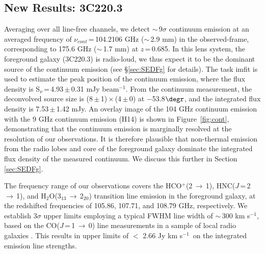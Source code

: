 \documentclass[twocolumn,apj,numberedappendix]{emulateapj}
\newcommand{\rarr}{$\rightarrow$}
\newcommand{\pmOne}{\mbox{$^{-1}$}}
\begin{document}
\subsection{New Results: 3C220.3} 
Averaging over all line-free channels, we detect $\sim$\,9$\sigma$ continuum emission at an averaged frequency of $\nu_{cont}$\,=\,104.2106 GHz ($\sim$\,2.9 mm) in the observed-frame, corresponding to 175.6 GHz ($\sim$\,1.7 mm) at $z$\,=\,0.685. In this lens system, the 
foreground galaxy (3C220.3) is radio-loud, we thus expect it to be the dominant source of the continuum emission (see \S \ref{sec:SEDFg} for details). The task {\sc imfit} is used to estimate the peak position of the continuum emission, where the flux density is S$_\nu$\,=\,4.93\,$\pm$\,0.31\,\,mJy\,\,beam\pmOne. From the continuum measurement, the deconvolved source size 
is (8\,$\pm$\,1)\,$\times$\,(4\,$\pm$\,0) at $-$53.8$\degr$, and the integrated flux density is 7.53\,$\pm$\,1.42\,\,mJy. An overlay image of the 104 GHz  
continuum emission with the 9 GHz continuum emission (H14) is shown in Figure~\ref{fig:cont}, demonstrating that the continuum 
emission is marginally resolved at the resolution of our observations. It is therefore plausible that non-thermal emission from the radio lobes and core of the foreground galaxy dominate the integrated flux 
density of the measured continuum. We discuss this further in Section \ref{sec:SEDFg}. \par
The frequency range of our observations covers the HCO$^+$(2\,\rarr\,1), HNC($J$\,=\,2\,$\rightarrow$\,1), and H$_2$O(3$_{13}$\,\rarr\,2$_{20}$) 
transition line emission in the foreground galaxy, at 
the redshifted frequencies of 105.86, 107.71, and 108.79\,\,GHz, respectively. We establish 3$\sigma$ upper limits employing a typical FWHM line width of 
$\sim$\,300\,\,km\,\,s\pmOne, based on the CO($J$\,=\,1\,$\rightarrow$\,0) line measurements in a sample of local radio galaxies \citep[$z$ $<$ 0.1; ][]{Smolcic11a}. This results in upper limits of $<$ 2.66\,\,Jy\,\,km\,\,s\pmOne\ on the integrated emission line strengths.
\end{document}
